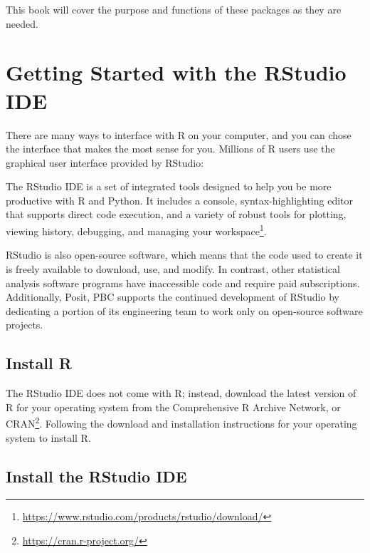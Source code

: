 \documentclass[
  krantz2]{krantz}
\renewenvironment{quote}{\begin{VF}}{\end{VF}}
\begin{document}
This book will cover the purpose and functions of these packages as they are needed.

\hypertarget{ide-start}{%
\section{Getting Started with the RStudio IDE}\label{ide-start}}

There are many ways to interface with R on your computer, and you can chose the interface that makes the most sense for you. Millions of R users use the graphical user interface provided by RStudio:

\begin{quote}
The RStudio IDE is a set of integrated tools designed to help you be more productive with R and Python. It includes a console, syntax-highlighting editor that supports direct code execution, and a variety of robust tools for plotting, viewing history, debugging, and managing your workspace\footnote{\url{https://www.rstudio.com/products/rstudio/download/}}.
\end{quote}

RStudio is also open-source software, which means that the code used to create it is freely available to download, use, and modify. In contrast, other statistical analysis software programs have inaccessible code and require paid subscriptions. Additionally, Posit, PBC supports the continued development of RStudio by dedicating a portion of its engineering team to work only on open-source software projects.

\hypertarget{install-r}{%
\subsection{Install R}\label{install-r}}

The RStudio IDE does not come with R; instead, download the latest version of R for your operating system from the Comprehensive R Archive Network, or CRAN\footnote{\url{https://cran.r-project.org/}}. Following the download and installation instructions for your operating system to install R.

\hypertarget{install-the-rstudio-ide}{%
\subsection{Install the RStudio IDE}\label{install-the-rstudio-ide}}
\end{document}
